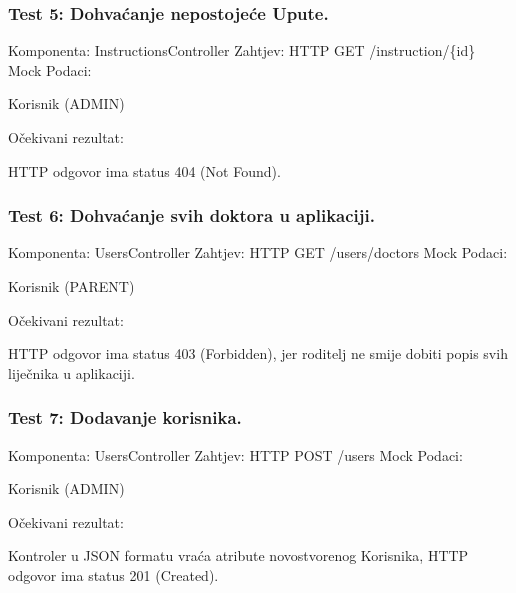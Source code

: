 			\subsubsection*{Test 5: Dohvaćanje nepostojeće Upute.}
			Komponenta: InstructionsController \newline
			Zahtjev: HTTP GET /instruction/\{id\} \newline
			Mock Podaci:
			\begin{packed_item}
				\item Korisnik (ADMIN)
			\end{packed_item}
			Očekivani rezultat:
			\begin{packed_item}
				\item HTTP odgovor ima status 404 (Not Found).
			\end{packed_item}
			

			\subsubsection*{Test 6: Dohvaćanje svih doktora u aplikaciji.}
			Komponenta: UsersController \newline
			Zahtjev: HTTP GET /users/doctors \newline
			Mock Podaci:
			\begin{packed_item}
				\item Korisnik (PARENT)
			\end{packed_item}
			Očekivani rezultat:
			\begin{packed_item}
				\item HTTP odgovor ima status 403 (Forbidden), jer roditelj ne smije dobiti popis svih liječnika u aplikaciji.
			\end{packed_item}
			
			
			\subsubsection*{Test 7: Dodavanje korisnika.}
			Komponenta: UsersController \newline
			Zahtjev: HTTP POST /users \newline
			Mock Podaci:
			\begin{packed_item}
				\item Korisnik (ADMIN)
			\end{packed_item}
			Očekivani rezultat:
			\begin{packed_item}
				\item Kontroler u JSON formatu vraća atribute novostvorenog Korisnika, HTTP odgovor ima status 201 (Created).
			\end{packed_item}
			

